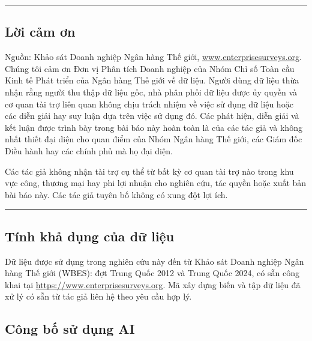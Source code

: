 \documentclass[12pt,a4paper]{article}
\begin{document}
\begin{center}\rule{0.5\linewidth}{0.5pt}\end{center}

\hypertarget{lux1eddi-cux1ea3m-ux1a1n}{%
\subsection{Lời cảm ơn}\label{lux1eddi-cux1ea3m-ux1a1n}}

Nguồn: Khảo sát Doanh nghiệp Ngân hàng Thế giới,
\href{http://www.enterprisesurveys.org}{www.enterprisesurveys.org}.
Chúng tôi cảm ơn Đơn vị Phân tích Doanh nghiệp của Nhóm Chỉ số Toàn cầu
Kinh tế Phát triển của Ngân hàng Thế giới về dữ liệu. Người dùng dữ liệu
thừa nhận rằng người thu thập dữ liệu gốc, nhà phân phối dữ liệu được ủy
quyền và cơ quan tài trợ liên quan không chịu trách nhiệm về việc sử
dụng dữ liệu hoặc các diễn giải hay suy luận dựa trên việc sử dụng đó.
Các phát hiện, diễn giải và kết luận được trình bày trong bài báo này
hoàn toàn là của các tác giả và không nhất thiết đại diện cho quan điểm
của Nhóm Ngân hàng Thế giới, các Giám đốc Điều hành hay các chính phủ mà
họ đại diện.

Các tác giả không nhận tài trợ cụ thể từ bất kỳ cơ quan tài trợ nào
trong khu vực công, thương mại hay phi lợi nhuận cho nghiên cứu, tác
quyền hoặc xuất bản bài báo này. Các tác giả tuyên bố không có xung đột
lợi ích.

\begin{center}\rule{0.5\linewidth}{0.5pt}\end{center}

\hypertarget{tuxednh-khux1ea3-dux1ee5ng-cux1ee7a-dux1eef-liux1ec7u}{%
\subsection{Tính khả dụng của dữ
liệu}\label{tuxednh-khux1ea3-dux1ee5ng-cux1ee7a-dux1eef-liux1ec7u}}

Dữ liệu được sử dụng trong nghiên cứu này đến từ Khảo sát Doanh nghiệp
Ngân hàng Thế giới (WBES): đợt Trung Quốc 2012 và Trung Quốc 2024, có
sẵn công khai tại \url{https://www.enterprisesurveys.org}. Mã xây dựng
biến và tập dữ liệu đã xử lý có sẵn từ tác giả liên hệ theo yêu cầu hợp
lý.

\hypertarget{cuxf4ng-bux1ed1-sux1eed-dux1ee5ng-ai}{%
\subsection{Công bố sử dụng
AI}\label{cuxf4ng-bux1ed1-sux1eed-dux1ee5ng-ai}}
\end{document}
